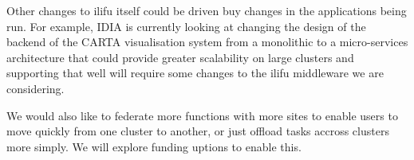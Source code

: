 \documentclass[12pt,twocolumn,a4paper]{article}
\begin{document}
Other changes to ilifu itself could be driven buy changes in the applications being run.
For example, IDIA is currently looking at changing the design of the backend of the 
CARTA visualisation system from a monolithic to a micro-services architecture that could
provide greater scalability on large clusters and supporting that well will require
some changes to the ilifu middleware we are considering.

We would also like to federate more functions with more sites to enable users to move quickly
from one cluster to another, or just offload tasks accross clusters more simply. We will
explore funding uptions to enable this.




\end{document}

